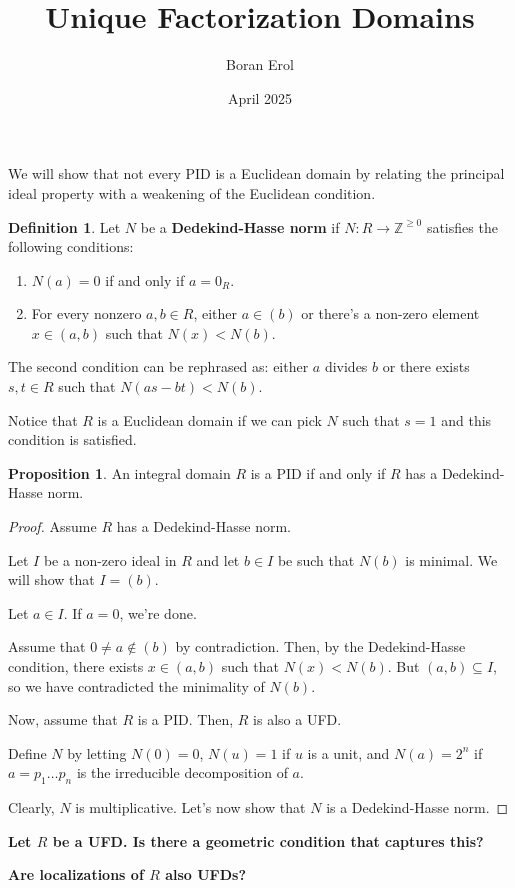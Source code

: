 \documentclass{article}
\title{Unique Factorization Domains}
\date{April 2025}
\author{Boran Erol}
\theoremstyle{definition}
\newtheorem{definition}{Definition}
\newtheorem{proposition}[theorem]{Proposition}
\begin{document}
\maketitle

We will show that not every PID is a Euclidean domain by relating the principal
ideal property with a weakening of the Euclidean condition.

\begin{definition}
    Let $ N $ be a \textbf{Dedekind-Hasse norm} if $ N: R \to \mathbb{Z}^{\geq 0} $
    satisfies the following conditions:

    \begin{enumerate}
        \item $ N(a) = 0 $ if and only if $ a = 0_{R} $.
        \item For every nonzero $ a,b \in R $, either $ a \in (b) $ or there's a non-zero
        element $ x \in (a,b) $ such that $ N(x) < N(b) $.
    \end{enumerate}
\end{definition}

The second condition can be rephrased as: either $ a $ divides $ b $ or there exists $ s,t \in R $
such that $ N(as - bt) < N(b) $.

Notice that $ R $ is a Euclidean domain if we can pick $ N $ such that $ s = 1 $ and this condition
is satisfied.

\begin{proposition}
    An integral domain $ R $ is a PID if and only if $ R $ has a Dedekind-Hasse norm.
\end{proposition}
\begin{proof}
    Assume $ R $ has a Dedekind-Hasse norm.

    Let $ I $ be a non-zero ideal in $ R $ and let $ b \in I $ be such that
    $ N(b) $ is minimal. We will show that $ I = (b) $.

    Let $ a \in I $. If $ a = 0 $, we're done.

    Assume that $ 0 \neq a \notin (b) $ by contradiction.
    Then, by the Dedekind-Hasse condition, there exists $ x \in (a,b) $
    such that $ N(x) < N(b) $. But $ (a,b) \subseteq I $, so we have contradicted
    the minimality of $ N(b) $.

    Now, assume that $ R $ is a PID. Then, $ R $ is also a UFD.

    Define $ N $ by letting $ N(0) = 0 $, $ N(u) = 1 $ if $ u $ is a unit,
    and $ N(a) = 2^{n} $ if $ a = p_{1} \ldots p_{n} $ is the irreducible decomposition of $ a $.

    Clearly, $ N $ is multiplicative. Let's now show that $ N $ is a Dedekind-Hasse norm.


\end{proof}



\newpage




\textbf{Let $ R $ be a UFD. Is there a geometric condition that captures this?}

\textbf{Are localizations of $ R $ also UFDs?}
\end{document}
